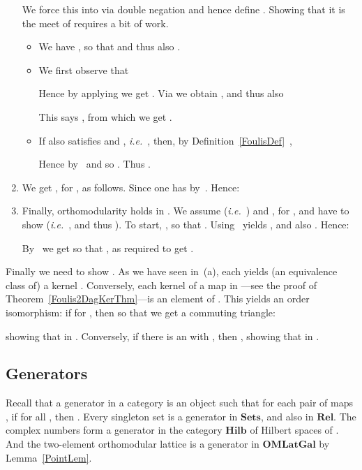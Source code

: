 \documentclass{article}
\newenvironment{proof}[1][Proof]{ \begin{trivlist}\item[\hskip \labelsep {\bfseries #1}]}{ \end{trivlist}}
\newcommand{\QED}{\hspace*{\fill}}
\newcommand{\Cat}[1]{\ensuremath{\mathbf{#1}}}
\newcommand{\Rel}{\Cat{Rel}\xspace}
\newcommand{\Hilb}{\Cat{Hilb}\xspace}
\newcommand{\Sets}{\Cat{Sets}\xspace}
\begin{document}
\begin{proof}
\begin{enumerate}
\noindent We force this  into  via double negation and hence
define . Showing that it is the
meet of  requires a bit of work.
\begin{itemize}
\item We have , so that  and thus also .

\item We first observe that


\noindent Hence by applying  we get . Via  we obtain , and thus also


\noindent This says , from
which we get .

\item If also  satisfies  and ,
\textit{i.e.}~, then, by
Definition~\ref{FoulisDef}~,


\noindent Hence 
by~ and so . Thus .
\end{itemize}

\item We get , for , as follows.
  Since  one has 
  by~. Hence:


\item Finally, orthomodularity holds in . We assume  (\textit{i.e.}~) and , for , and have to show 
  (\textit{i.e.}~, and thus ). To start,
  , so that . Using~ yields , and also . Hence:


\noindent By~ we get  so that
, as required to get
.
\end{enumerate}

Finally we need to show . As we have seen
in~(a), each  yields (an equivalence class of) a kernel
. Conversely, each kernel  of a map  in
---see the proof of
Theorem~\ref{Foulis2DagKerThm}---is an element of . This yields
an order isomorphism: if  for , then  so that we get a commuting
triangle:


\noindent showing that  in . Conversely,
if there is an  with ,
then ,
showing that  in . \QED
\end{proof}



\subsection{Generators}\label{GeneratorSubsec}

Recall that a generator in a category is an object  such that for
each pair of maps , if  for all , then . Every singleton set
is a generator in \Sets, and also in \Rel. The complex numbers
 form a generator in the category \Hilb of Hilbert spaces
of . And the two-element orthomodular lattice is a
generator in \Cat{OMLatGal} by Lemma~\ref{PointLem}.
\end{document}
